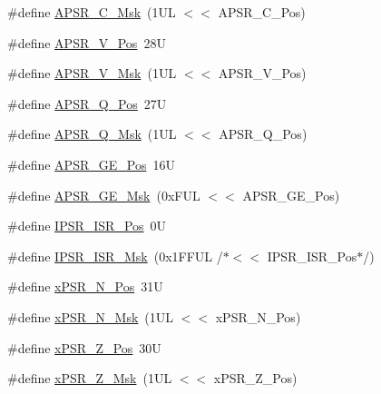 \begin{DoxyCompactItemize}
\#define \mbox{\hyperlink{group___c_m_s_i_s___c_o_r_e_ga6d47803fbad455bc10bd1ce59f2f335d}{A\+P\+S\+R\+\_\+\+C\+\_\+\+Msk}}~(1\+U\+L $<$$<$ A\+P\+S\+R\+\_\+\+C\+\_\+\+Pos)
\item 
\#define \mbox{\hyperlink{group___c_m_s_i_s___c_o_r_e_gac62830f67679ccd11658c4172c3e6ea7}{A\+P\+S\+R\+\_\+\+V\+\_\+\+Pos}}~28U
\item 
\#define \mbox{\hyperlink{group___c_m_s_i_s___c_o_r_e_ga33305d6701356bff6890b315fe8b5489}{A\+P\+S\+R\+\_\+\+V\+\_\+\+Msk}}~(1\+U\+L $<$$<$ A\+P\+S\+R\+\_\+\+V\+\_\+\+Pos)
\item 
\#define \mbox{\hyperlink{group___c_m_s_i_s___c_o_r_e_ga298749e176f12827328bb7b92a6b2411}{A\+P\+S\+R\+\_\+\+Q\+\_\+\+Pos}}~27U
\item 
\#define \mbox{\hyperlink{group___c_m_s_i_s___c_o_r_e_ga90ffd4ec4149c2f5dd7747c1533fb002}{A\+P\+S\+R\+\_\+\+Q\+\_\+\+Msk}}~(1\+U\+L $<$$<$ A\+P\+S\+R\+\_\+\+Q\+\_\+\+Pos)
\item 
\#define \mbox{\hyperlink{group___c_m_s_i_s___c_o_r_e_ga722cb42b5c75af3e8909fac6fd40dfdc}{A\+P\+S\+R\+\_\+\+G\+E\+\_\+\+Pos}}~16U
\item 
\#define \mbox{\hyperlink{group___c_m_s_i_s___c_o_r_e_ga8a3ecbc0ea2029462b0f4ce50e227db1}{A\+P\+S\+R\+\_\+\+G\+E\+\_\+\+Msk}}~(0x\+F\+U\+L $<$$<$ A\+P\+S\+R\+\_\+\+G\+E\+\_\+\+Pos)
\item 
\#define \mbox{\hyperlink{group___c_m_s_i_s___c_o_r_e_ga0e34027584d02c43811ae908a5ca9adf}{I\+P\+S\+R\+\_\+\+I\+S\+R\+\_\+\+Pos}}~0U
\item 
\#define \mbox{\hyperlink{group___c_m_s_i_s___c_o_r_e_gaf013a4579a64d1f21f56ea9f1b33ab56}{I\+P\+S\+R\+\_\+\+I\+S\+R\+\_\+\+Msk}}~(0x1\+F\+F\+U\+L /$\ast$$<$$<$ I\+P\+S\+R\+\_\+\+I\+S\+R\+\_\+\+Pos$\ast$/)
\item 
\#define \mbox{\hyperlink{group___c_m_s_i_s___c_o_r_e_ga031eb1b8ebcdb3d602d0b9f2ec82a7ae}{x\+P\+S\+R\+\_\+\+N\+\_\+\+Pos}}~31U
\item 
\#define \mbox{\hyperlink{group___c_m_s_i_s___c_o_r_e_gaf600f4ff41b62cf2f3b0a59b6d2e93d6}{x\+P\+S\+R\+\_\+\+N\+\_\+\+Msk}}~(1\+U\+L $<$$<$ x\+P\+S\+R\+\_\+\+N\+\_\+\+Pos)
\item 
\#define \mbox{\hyperlink{group___c_m_s_i_s___c_o_r_e_ga5869dd608eea73c80f0567d781d2230b}{x\+P\+S\+R\+\_\+\+Z\+\_\+\+Pos}}~30U
\item 
\#define \mbox{\hyperlink{group___c_m_s_i_s___c_o_r_e_ga907599209fba99f579778e662021c4f2}{x\+P\+S\+R\+\_\+\+Z\+\_\+\+Msk}}~(1\+U\+L $<$$<$ x\+P\+S\+R\+\_\+\+Z\+\_\+\+Pos)
\item 

\end{DoxyCompactItemize}
